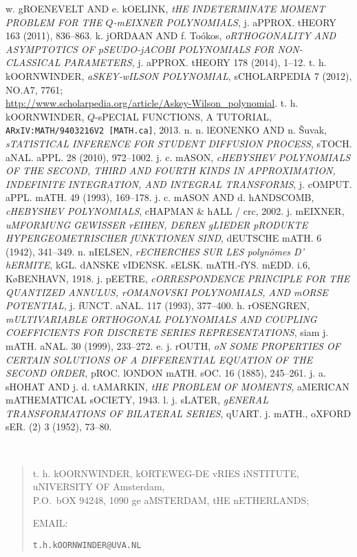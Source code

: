 \documentclass[twoside,11pt]{article}
\begin{document}
\begin{thebibliography}{999}
w. gROENEVELT AND e. kOELINK, 
{\em tHE INDETERMINATE MOMENT PROBLEM FOR THE $Q$-mEIXNER POLYNOMIALS}, 
j. aPPROX. tHEORY 163 (2011), 836--863. 
% 
k. jORDAAN AND f. To\'okos, 
{\em oRTHOGONALITY AND ASYMPTOTICS OF pSEUDO-jACOBI POLYNOMIALS FOR 
 NON-CLASSICAL PARAMETERS}, 
j. aPPROX. tHEORY 178 (2014), 1--12. 
% 
t. h. kOORNWINDER, {\em aSKEY-wILSON POLYNOMIAL}, sCHOLARPEDIA 7 (2012), NO.A7, 
7761;\\ 
 \url{http://www.scholarpedia.org/article/Askey-Wilson_polynomial}. 
% 
t. h. kOORNWINDER, 
{$Q$-sPECIAL FUNCTIONS, A TUTORIAL}, 
{\tt ARxIV:MATH/9403216V2 [MATH.ca]}, 2013. 
 n. n. lEONENKO AND n. \v{S}uvak, 
{\em sTATISTICAL INFERENCE FOR STUDENT DIFFUSION PROCESS}, 
sTOCH. aNAL. aPPL. 28 (2010), 972--1002. 
% 
j. c. mASON, 
{\em cHEBYSHEV POLYNOMIALS OF THE SECOND, THIRD AND FOURTH KINDS IN 
APPROXIMATION, INDEFINITE INTEGRATION, AND INTEGRAL TRANSFORMS}, 
j. cOMPUT. aPPL. mATH. 49 (1993), 169--178. 
% 
j. c. mASON AND d. hANDSCOMB, 
{\em cHEBYSHEV POLYNOMIALS}, 
cHAPMAN \& hALL / crc, 2002. 
% 
j. mEIXNER, 
{\em uMFORMUNG GEWISSER rEIHEN, DEREN gLIEDER pRODUKTE HYPERGEOMETRISCHER 
fUNKTIONEN SIND}, 
dEUTSCHE mATH.  6 (1942),  341--349. 
% 
n. nIELSEN, 
{\em rECHERCHES SUR LES polyn\^omes D' hERMITE}, 
kGL. dANSKE vIDENSK. sELSK. mATH.-fYS. mEDD. i.6, K\o BENHAVN, 1918. 
% 
j. pEETRE, 
{\em cORRESPONDENCE PRINCIPLE FOR THE QUANTIZED ANNULUS, rOMANOVSKI  POLYNOMIALS, 
AND mORSE POTENTIAL}, 
j. fUNCT. aNAL.  117 (1993), 377--400. 
% 
h. rOSENGREN, 
{\em mULTIVARIABLE ORTHOGONAL POLYNOMIALS AND COUPLING COEFFICIENTS FOR 
DISCRETE SERIES REPRESENTATIONS}, 
siam j. mATH. aNAL.  30  (1999),  233--272. 
% 
e. j. rOUTH, 
{\em oN SOME PROPERTIES OF CERTAIN SOLUTIONS OF A DIFFERENTIAL EQUATION OF THE SECOND ORDER}, 
pROC. lONDON mATH. sOC. 16 (1885), 245--261. 
% 
j. a. sHOHAT AND j. d. tAMARKIN, 
{\em tHE PROBLEM OF MOMENTS}, 
aMERICAN mATHEMATICAL sOCIETY, 1943. 
% 
l. j. sLATER, 
{\em gENERAL TRANSFORMATIONS OF BILATERAL SERIES}, 
qUART. j. mATH., oXFORD sER. (2) 3 (1952), 73--80. 
% 
\end{thebibliography} 
\quad\\ 
\begin{footnotesize} 
\begin{quote} 
{t. h. kOORNWINDER, kORTEWEG-DE vRIES iNSTITUTE, uNIVERSITY OF Amsterdam,\\ 
P.O.\ bOX 94248, 1090 ge aMSTERDAM, tHE nETHERLANDS; 
 
\vspace{\smallskipamount} 
EMAIL: }{\tt t.h.kOORNWINDER@UVA.NL} 
\end{quote} 
\end{footnotesize} 
\end{document}

